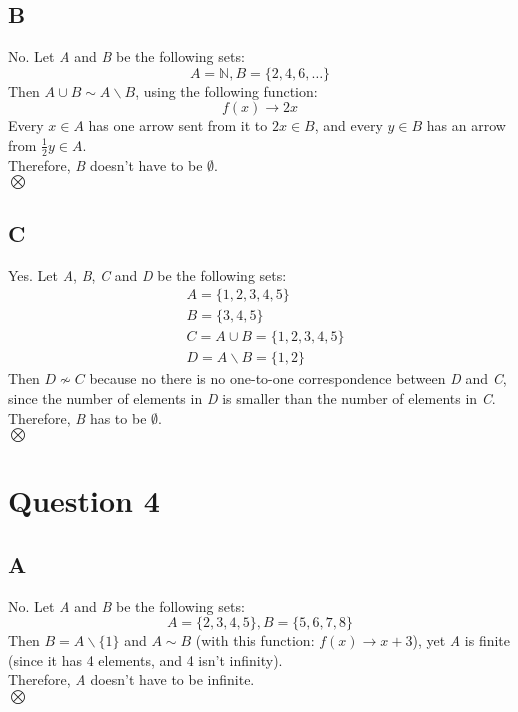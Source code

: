 \documentclass[12pt, oneside]{article}
\begin{document}
\subsection{B}
No. Let \emph{A} and \emph{B} be the following sets:
\begin{equation*}
A = \mathbb{N}, B = \{2, 4, 6, \ldots\}
\end{equation*}
Then $A \cup B \sim A \backslash B$, using the following function:
\begin{equation*}
f(x) \rightarrow 2x
\end{equation*}
Every $x \in A$ has one arrow sent from it to $2x \in B$, and every $y \in B$ has an arrow from $\frac{1}{2}y \in A$.\\
Therefore, \emph{B} doesn't have to be $\emptyset$.\\
$\bigotimes$

\subsection{C}
Yes. Let \emph{A}, \emph{B}, \emph{C} and \emph{D} be the following sets:
\begin{equation*}
\begin{split}
& A = \{1, 2, 3, 4, 5\}\\
& B = \{3, 4, 5\}\\
& C = A \cup B = \{1, 2, 3, 4, 5\}\\
& D = A \backslash B = \{1, 2\}
\end{split}
\end{equation*}
Then $D \nsim C$ because no there is no one-to-one correspondence between \emph{D} and \emph{C}, since the number of elements in \emph{D} is smaller than the number of elements in \emph{C}.\\
Therefore, \emph{B} has to be $\emptyset$.\\
$\bigotimes$
\clearpage

\section{Question 4}
\subsection{A}
No. Let \emph{A} and \emph{B} be the following sets:
\begin{equation*}
A = \{2, 3, 4, 5\}, B = \{5, 6, 7, 8\}
\end{equation*}
Then $B = A\backslash\{1\}$ and $A \sim B$ (with this function: $f(x) \rightarrow x + 3$), yet \emph{A} is finite (since it has 4 elements, and 4 isn't infinity).\\
Therefore, \emph{A} doesn't have to be infinite.\\
$\bigotimes$
\end{document}

